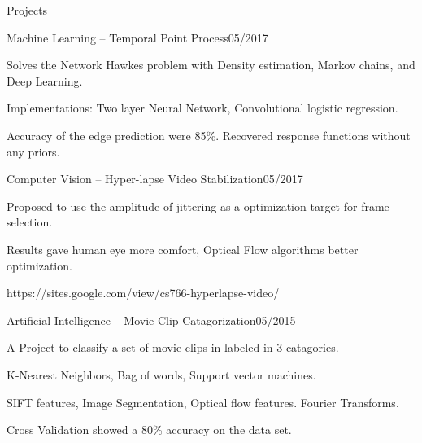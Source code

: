 \documentclass{resume} %
\begin{document}
\begin{rSection}{Projects}

\begin{rSubsection}{Machine Learning -- Temporal Point Process}{05/2017}{}{}
\item Solves the Network Hawkes problem with Density estimation, Markov chains, and Deep Learning.
\item Implementations: Two layer Neural Network, Convolutional logistic regression.
\item Accuracy of the edge prediction were 85\%. Recovered response functions without any priors.
\end{rSubsection}


\begin{rSubsection}{Computer Vision -- Hyper-lapse Video Stabilization}{05/2017}{}{}
\item Proposed to use the amplitude of jittering as a optimization target for frame selection.
\item Results gave human eye more comfort, Optical Flow algorithms better optimization. 
\item https://sites.google.com/view/cs766-hyperlapse-video/
\end{rSubsection}


\begin{rSubsection}{Artificial Intelligence -- Movie Clip Catagorization}{05/2015}{}{}
\item A Project to classify a set of movie clips in labeled in 3 catagories. 
\item K-Nearest Neighbors, Bag of words, Support vector machines.
\item SIFT features, Image Segmentation, Optical flow features. Fourier Transforms.
\item Cross Validation showed a 80\% accuracy on the data set.

\end{rSubsection}

\end{rSection}
\end{document}
